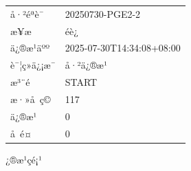 \documentclass[UTF8,10pt,a4paper,fontset=fandol]{ctexart}
\newcommand{\fieldvalue}[1]{#1}
\begin{document}
\begin{center}
\begin{center}
\begin{tabular}{@{}ll@{}}
å·²éªè¯ &
\fieldvalue{20250730-PGE2-2}\\
æ¥æ &
\fieldvalue{éè¿}\\
ä¿®æ¹äºº &
\fieldvalue{2025-07-30T14:34:08+08:00}\\
è¯¦ç»ä¿¡æ¯ &
\fieldvalue{å·²ä¿®æ¹}\\
æ³¨é &
\fieldvalue{START}\\
æ·»å ç© &
\fieldvalue{117}\\
ä¿®æ¹ &
\fieldvalue{0}\\
å é¤ &
\fieldvalue{0}\\
\end{tabular}

\medskip

¿®æ¹çé¡¹


\end{center}
\end{center}
\end{document}
